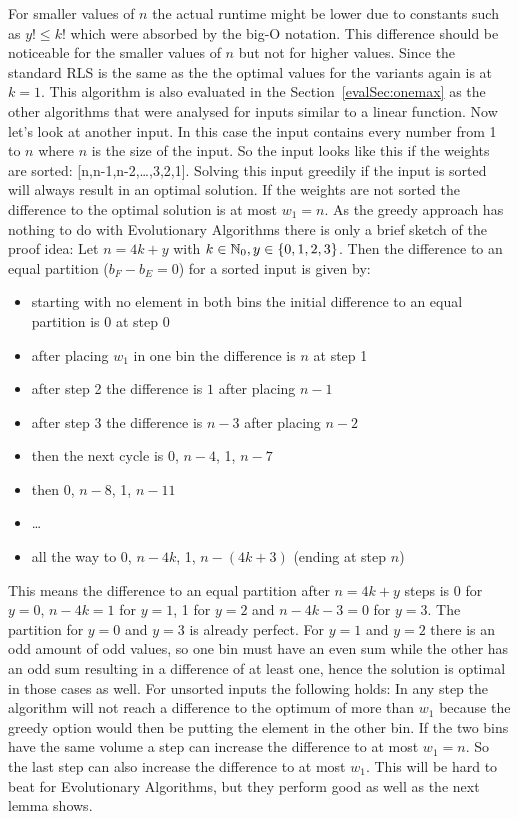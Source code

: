 For smaller values of $n$ the actual runtime might be lower due to constants such as $y!\le k!$ which were absorbed by the big-O notation.
This difference should be noticeable for the smaller values of $n$ but not for higher values.
Since the standard RLS is the same as the \RLSN[1] the optimal values for the \RLSN[k] variants again is at $k=1$.
This algorithm is also evaluated in the Section~\ref{evalSec:onemax} as the other algorithms that were analysed for inputs similar to a linear function.\newline
Now let's look at another input.
In this case the input contains every number from 1 to $n$ where $n$ is the size of the input.
So the input looks like this if the weights are sorted: [n,n-1,n-2,\dots,3,2,1].
Solving this input greedily if the input is sorted will always result in an optimal solution.
If the weights are not sorted the difference to the optimal solution is at most $w_1=n$.
As the greedy approach has nothing to do with Evolutionary Algorithms there is only a brief sketch of the proof idea:\newline
Let $n=4k+y$ with $k\in \mathbb{N}_0, y \in\{0,1,2,3\}$. Then the difference to an equal partition ($b_F-b_E=0$) for a sorted input is given by:
\begin{itemize}
    \item starting with no element in both bins the initial difference to an equal partition is 0 at step 0
    \item after placing $w_1$ in one bin the difference is $n$ at step 1
    \item after step 2 the difference is $1$ after placing $n-1$
    \item after step 3 the difference is $n-3$ after placing $n-2$
    \item then the next cycle is 0, $n-4$, 1, $n-7$
    \item then 0, $n-8$, 1, $n-11$
    \item \dots
    \item all the way to 0, $n-4k$, 1, $n-(4k+3)$ (ending at step $n$)
\end{itemize}
This means the difference to an equal partition after $n=4k+y$ steps is 0 for $y=0$, $n-4k=1$ for $y=1$, 1 for $y=2$ and $n-4k-3=0$ for $y=3$.
The partition for $y=0$ and $y=3$ is already perfect.
For $y=1$ and $y=2$ there is an odd amount of odd values, so one bin must have an even sum while the other has an odd sum resulting in a difference of at least one, hence the solution is optimal in those cases as well.
For unsorted inputs the following holds: In any step the algorithm will not reach a difference to the optimum of more than $w_1$ because the greedy option would then be putting the element in the other bin.
If the two bins have the same volume a step can increase the difference to at most $w_1=n$.
So the last step can also increase the difference to at most $w_1$.\newline
This will be hard to beat for Evolutionary Algorithms, but they perform good as well as the next lemma shows.

